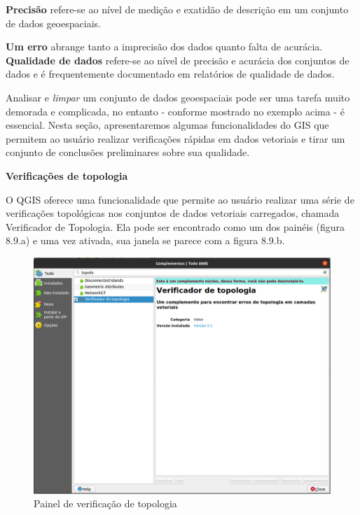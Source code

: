 \documentclass[
]{krantz}
\begin{document}
\textbf{Precisão} refere-se ao nível de medição e exatidão de descrição em um conjunto de dados geoespaciais.

\textbf{Um erro} abrange tanto a imprecisão dos dados quanto falta de acurácia. \textbf{Qualidade de dados} refere-se ao nível de precisão e acurácia dos conjuntos de dados e é frequentemente documentado em relatórios de qualidade de dados.

Analisar e \emph{limpar} um conjunto de dados geoespaciais pode ser uma tarefa muito demorada e complicada, no entanto - conforme mostrado no exemplo acima - é essencial. Nesta seção, apresentaremos algumas funcionalidades do GIS que permitem ao usuário realizar verificações rápidas em dados vetoriais e tirar um conjunto de conclusões preliminares sobre sua qualidade.

\textbf{Verificações de topologia}

O QGIS oferece uma funcionalidade que permite ao usuário realizar uma série de verificações topológicas nos conjuntos de dados vetoriais carregados, chamada Verificador de Topologia. Ela pode ser encontrado como um dos painéis (figura 8.9.a) e uma vez ativada, sua janela se parece com a figura 8.9.b.

\begin{figure}
\centering
\includegraphics{media/modulo8/fig89_a.png}
\caption{Painel de verificação de topologia}
\end{figure}
\end{document}

